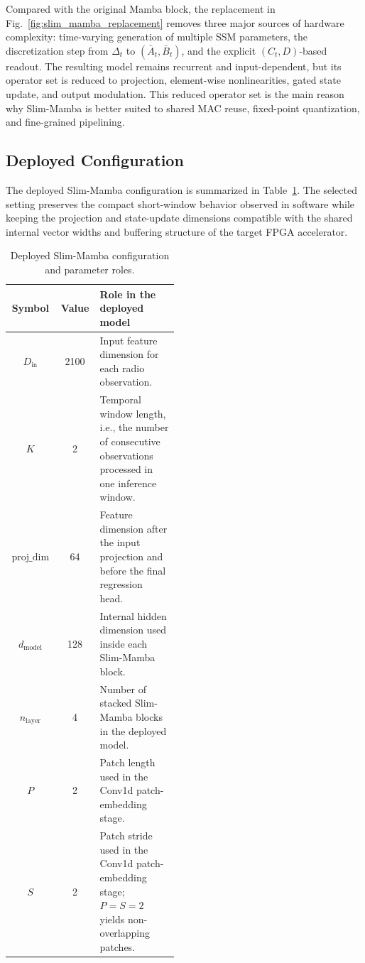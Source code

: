 \documentclass[lettersize,journal]{IEEEtran}
\begin{document}
Compared with the original Mamba block, the replacement in
Fig.~\ref{fig:slim_mamba_replacement} removes three major sources of hardware
complexity: time-varying generation of multiple SSM
parameters, the discretization step from \(\Delta_t\) to
\((\bar{A}_t,\bar{B}_t)\), and the explicit \((C_t,D)\)-based readout. The
resulting model remains recurrent and input-dependent, but its operator set is
reduced to projection, element-wise nonlinearities, gated state update, and
output modulation. This reduced operator set is the main reason why Slim-Mamba
is better suited to shared MAC reuse, fixed-point quantization, and fine-grained
pipelining.

\subsection{Deployed Configuration}

The deployed Slim-Mamba configuration is summarized in
Table~\ref{tab:slim_config_tcas}. The selected setting preserves the compact
short-window behavior observed in software while keeping the projection and
state-update dimensions compatible with the shared internal vector widths and
buffering structure of the target FPGA accelerator.

\begin{table}[!t]
\caption{Deployed Slim-Mamba configuration and parameter roles.}
\label{tab:slim_config_tcas}
\begin{center}
\footnotesize
\setlength{\tabcolsep}{4pt}
\renewcommand{\arraystretch}{1.08}
\begin{tabular}{|c|c|p{0.47\linewidth}|}
\hline
\textbf{Symbol} & \textbf{Value} & \textbf{Role in the deployed model} \\
\hline
\(D_{\mathrm{in}}\) & 2100 & Input feature dimension for each radio observation. \\
\hline
\(K\) & 2 & Temporal window length, i.e., the number of consecutive observations processed in one inference window. \\
\hline
\(\text{proj\_dim}\) & 64 & Feature dimension after the input projection and before the final regression head. \\
\hline
\(d_{\mathrm{model}}\) & 128 & Internal hidden dimension used inside each Slim-Mamba block. \\
\hline
\(n_{\mathrm{layer}}\) & 4 & Number of stacked Slim-Mamba blocks in the deployed model. \\
\hline
\(P\) & 2 & Patch length used in the Conv1d patch-embedding stage. \\
\hline
\(S\) & 2 & Patch stride used in the Conv1d patch-embedding stage; \(P=S=2\) yields non-overlapping patches. \\
\hline
\end{tabular}
\end{center}
\end{table}
\end{document}
